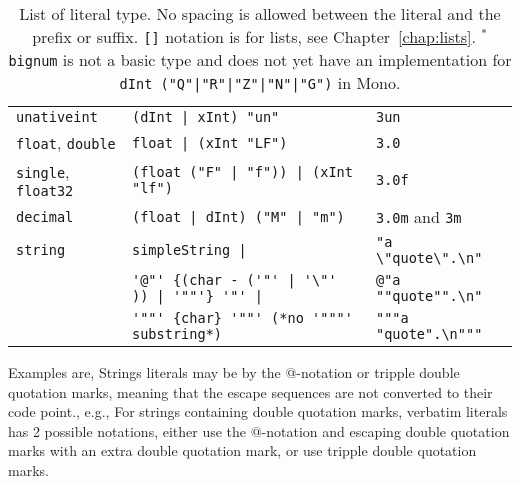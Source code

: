 \begin{table}
\begin{tabular}{|l|l|l|}
    \lstinline!unativeint! & \lstinline[language=ebnf]!(dInt | xInt) "un"!  & \lstinline!3un!  \\
    \lstinline!float!, \lstinline!double! & \lstinline[language=ebnf]!float | (xInt "LF")!  & \lstinline!3.0!  \\
    \lstinline!single!, \lstinline!float32! & \lstinline[language=ebnf]!(float ("F" | "f")) | (xInt "lf") !  & \lstinline!3.0f!  \\
    \lstinline!decimal! &\lstinline[language=ebnf]!(float | dInt) ("M" | "m")! & \lstinline!3.0m! and \lstinline!3m!  \\
    \lstinline!string! & \lstinline[language=ebnf]!simpleString |! & \lstinline!"a \"quote\".\n"!  \\
         & \lstinline[language=ebnf]!'@"' {(char - ('"' | '\"' )) | '""'} '"' |!&\lstinline!@"a ""quote"".\n"! \\
         & \lstinline[language=ebnf]!'""' {char} '""' (*no '"""' substring*)! & \lstinline!"""a "quote".\n"""!  \\
    \hline
  \end{tabular}
  \caption{List of literal type. No spacing is allowed between the literal and the prefix or suffix. \lstinline![]! notation is for lists, see Chapter~\ref{chap:lists}. $^*$\lstinline[language=ebnf]!bignum! is not a basic type and does not yet have an implementation for \lstinline[language=ebnf]!dInt ("Q"|"R"|"Z"|"N"|"G")! in Mono.}
  \label{tab:literalTypes}
\end{table}
Examples are,
%
Strings literals may be  by the @-notation or tripple double quotation marks, meaning that the escape sequences are not converted to their code point., e.g., 
%
%
For strings containing double quotation marks, verbatim literals has 2 possible notations, either use the @-notation and escaping double quotation marks with an extra double quotation mark, or use tripple double quotation marks. 

